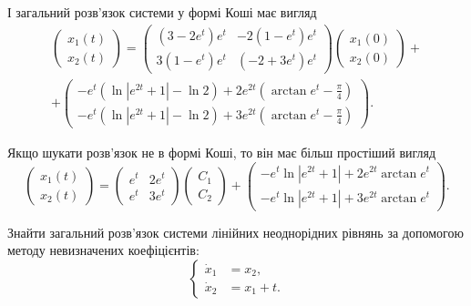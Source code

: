 \begin{solution}
	І загальний розв'язок системи у формі Коші має вигляд
	\begin{multline*}
		\begin{pmatrix} x_1(t) \\ x_2(t) \end{pmatrix} = \begin{pmatrix} (3 - 2 e^t) e^t & -2 (1 - e^t) e^t \\ 3 (1 - e^t) e^t & (-2 + 3 e^t) e^t \end{pmatrix} \begin{pmatrix} x_1(0) \\ x_2(0) \end{pmatrix} + \\
		+ \begin{pmatrix} -e^t (\ln |e^{2 t} + 1| - \ln 2) + 2 e^{2 t} \left( \arctan e^t - \frac\pi4 \right) \\ -e^t (\ln |e^{2 t} + 1| - \ln 2) + 3 e^{2 t} \left( \arctan e^t - \frac\pi4 \right) \end{pmatrix}.
	\end{multline*}
\end{solution}

\begin{remark}
	Якщо шукати розв'язок не в формі Коші, то він має більш простіший вигляд
	\begin{equation*}
		\begin{pmatrix} x_1(t) \\ x_2(t) \end{pmatrix} = \begin{pmatrix} e^t & 2 e^t \\ e^t & 3 e^t \end{pmatrix} \begin{pmatrix} C_1 \\ C_2 \end{pmatrix} + \begin{pmatrix} -e^t \ln |e^{2 t} + 1| + 2 e^{2 t} \arctan e^t \\ -e^t \ln |e^{2 t} + 1| + 3 e^{2 t} \arctan e^t \end{pmatrix}.
	\end{equation*}
\end{remark}

\begin{example}
	Знайти загальний розв'язок системи лінійних неоднорідних рівнянь за допомогою методу невизначених коефіцієнтів:
	\begin{equation*}
		\left\{
			\begin{aligned}
				\dot x_1 &= x_2, \\
				\dot x_2 &= x_1 + t.
			\end{aligned}
		\right.
	\end{equation*}
\end{example}


